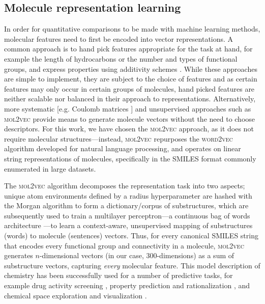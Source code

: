 \documentclass[twocolumn]{aastex63}
\begin{document}
\subsection{Molecule representation learning}

In order for quantitative comparisons to be made with machine learning methods, molecular features need to first be encoded into vector representations. A common approach is to hand pick features appropriate for the task at hand, for example the length of hydrocarbons or the number and types of functional groups, and express properties using additivity schemes \citep{benson_additivity_1958}. While these approaches are simple to implement, they are subject to the choice of features and as certain features may only occur in certain groups of molecules, hand picked features are neither scalable nor balanced in their approach to representations. Alternatively, more systematic [e.g. Coulomb matrices \citep{rupp_fast_2012}] and unsupervised approaches such as \textsc{mol2vec} \citep{jaeger_mol2vec_2018} provide means to generate molecule vectors without the need to choose descriptors. For this work, we have chosen the \textsc{mol2vec} approach, as it does not require molecular structures---instead, \textsc{mol2vec} repurposes the \textsc{word2vec} algorithm \citep{mikolov_efficient_2013} developed for natural language processing, and operates on linear string representations of molecules, specifically in the SMILES format \citep{weininger_smiles_1988,oboyle_towards_2012} commonly enumerated in large datasets.

The \textsc{mol2vec} algorithm decomposes the representation task into two aspects; unique atom environments defined by a radius hyperparameter are hashed with the Morgan algorithm \citep{morgan_generation_1965} to form a dictionary/corpus of substructures, which are subsequently used to train a multilayer perceptron---a continuous bag of words architecture \citep{mikolov_efficient_2013}---to learn a context-aware, unsupervised mapping of substructures (words) to molecule (sentences) vectors. Thus, for every canonical SMILES string that encodes every functional group and connectivity in a molecule, \textsc{mol2vec} generates $n$-dimensional vectors (in our case, 300-dimensions) as a sum of substructure vectors, capturing \emph{every} molecular feature. This model description of chemistry has been successfully used for a number of predictive tasks, for example drug activity screening \citep{das_repurposed_2021}, property prediction and rationalization \citep{zheng_identifying_2019}, and chemical space exploration and visualization \citep{shibayama_application_2020}.
\end{document}
